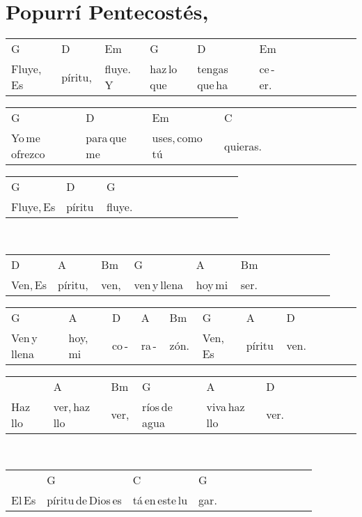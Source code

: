 \section*{Popurrí Pentecostés, \hfill}
\begin{multicols}{2}
\noindent
\begin{minipage}{\columnwidth}
\noindent
\noindent
\begin{tabular}{llllllllllll}
G&D&Em&G&D&Em\\
Fluye,\,Es&píritu,\,&fluye.\,Y\,&haz\,lo\,que\,&tengas\,que\,ha&ce\,-\,er.
\end{tabular}

\noindent
\begin{tabular}{llllllllllll}
G&D&Em&C\\
Yo\,me\,ofrezco\,&para\,que\,me\,&uses,\,como\,tú\,&quieras.
\end{tabular}

\noindent
\begin{tabular}{llllllllllll}
G&D&G\\
Fluye,\,Es&píritu\,&fluye.
\end{tabular}
\end{minipage}\\

\noindent
\begin{minipage}{\columnwidth}
\noindent
\noindent
\begin{tabular}{llllllllllll}
D&A&Bm&G&A&Bm\\
Ven,\,Es&píritu,\,&ven,\,&ven\,y\,llena\,&hoy\,mi\,&ser.
\end{tabular}

\noindent
\begin{tabular}{llllllllllll}
G&A&D&A&Bm&G&A&D\\
Ven\,y\,llena\,&hoy,\,mi\,&co\,-\,&ra\,-\,&zón.\,&Ven,\,Es&píritu\,&ven.
\end{tabular}

\noindent
\begin{tabular}{llllllllllll}
&A&Bm&G&A&D\\
Haz\,llo&ver,\,haz\,llo&ver,\,&ríos\,de\,agua\,&viva\,haz\,llo&ver.
\end{tabular}
\end{minipage}\\

\noindent
\begin{minipage}{\columnwidth}
\noindent
\noindent
\begin{tabular}{llllllllllll}
&G&C&G\\
El\,Es&píritu\,de\,Dios\,es&tá\,en\,este\,lu&gar.
\end{tabular}


\end{minipage}
\end{multicols}
